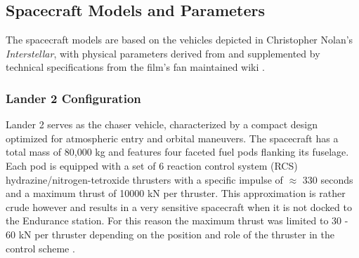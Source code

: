 \subsection{Spacecraft Models and Parameters}

The spacecraft models are based on the vehicles depicted in Christopher Nolan's
\textit{Interstellar}, with physical parameters derived from
\textcite{Girija2016} and supplemented by technical specifications from the
film's fan maintained wiki \parencite{fandom2025lander}.

\subsubsection{Lander 2 Configuration}

Lander 2 serves as the chaser vehicle, characterized by a compact design
optimized for atmospheric entry and orbital maneuvers. The spacecraft has a
total mass of 80,000 kg and features four faceted fuel
pods flanking its fuselage. Each pod is equipped with a set of 6 reaction
control system (RCS) hydrazine/nitrogen-tetroxide thrusters with a specific impulse of $\approx$ 330 seconds and a maximum thrust of 10000 kN per thruster.
This approximation is rather crude however and results in a very sensitive
spacecraft when it is not docked to the Endurance station. For this reason the
maximum thrust was limited to 30 - 60 kN per thruster depending on the position
and role of the thruster in the control scheme \parencite{Girija2016,muhalim2010design}.

